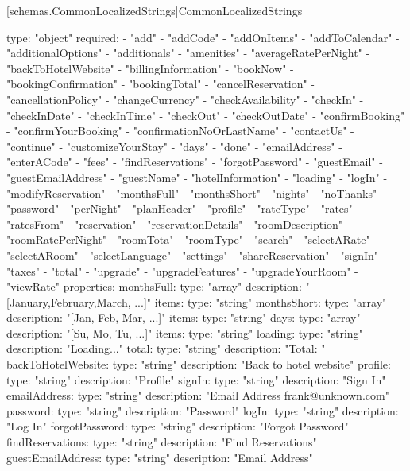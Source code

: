 [schemas.CommonLocalizedStrings]{CommonLocalizedStrings}
\begin{codeblock}
  type: "object"
  required:
  - "add"
  - "addCode"
  - "addOnItems"
  - "addToCalendar"
  - "additionalOptions"
  - "additionals"
  - "amenities"
  - "averageRatePerNight"
  - "backToHotelWebsite"
  - "billingInformation"
  - "bookNow"
  - "bookingConfirmation"
  - "bookingTotal"
  - "cancelReservation"
  - "cancellationPolicy"
  - "changeCurrency"
  - "checkAvailability"
  - "checkIn"
  - "checkInDate"
  - "checkInTime"
  - "checkOut"
  - "checkOutDate"
  - "confirmBooking"
  - "confirmYourBooking"
  - "confirmationNoOrLastName"
  - "contactUs"
  - "continue"
  - "customizeYourStay"
  - "days"
  - "done"
  - "emailAddress"
  - "enterACode"
  - "fees"
  - "findReservations"
  - "forgotPassword"
  - "guestEmail"
  - "guestEmailAddress"
  - "guestName"
  - "hotelInformation"
  - "loading"
  - "logIn"
  - "modifyReservation"
  - "monthsFull"
  - "monthsShort"
  - "nights"
  - "noThanks"
  - "password"
  - "perNight"
  - "planHeader"
  - "profile"
  - "rateType"
  - "rates"
  - "ratesFrom"
  - "reservation"
  - "reservationDetails"
  - "roomDescription"
  - "roomRatePerNight"
  - "roomTota"
  - "roomType"
  - "search"
  - "selectARate"
  - "selectARoom"
  - "selectLanguage"
  - "settings"
  - "shareReservation"
  - "signIn"
  - "taxes"
  - "total"
  - "upgrade"
  - "upgradeFeatures"
  - "upgradeYourRoom"
  - "viewRate"
  properties:
    monthsFull:
      type: "array"
      description: "[January,February,March, ...]"
      items:
        type: "string"
    monthsShort:
      type: "array"
      description: "[Jan, Feb, Mar, ...]"
      items:
        type: "string"
    days:
      type: "array"
      description: "[Su, Mo, Tu, ...]"
      items:
        type: "string"
    loading:
      type: "string"
      description: "Loading..."
    total:
      type: "string"
      description: "Total: "
    backToHotelWebsite:
      type: "string"
      description: "Back to hotel website"
    profile:
      type: "string"
      description: "Profile"
    signIn:
      type: "string"
      description: "Sign In"
    emailAddress:
      type: "string"
      description: "Email Address frank@unknown.com"
    password:
      type: "string"
      description: "Password"
    logIn:
      type: "string"
      description: "Log In"
    forgotPassword:
      type: "string"
      description: "Forgot Password"
    findReservations:
      type: "string"
      description: "Find Reservations"
    guestEmailAddress:
      type: "string"
      description: "Email Address"

\end{codeblock}
